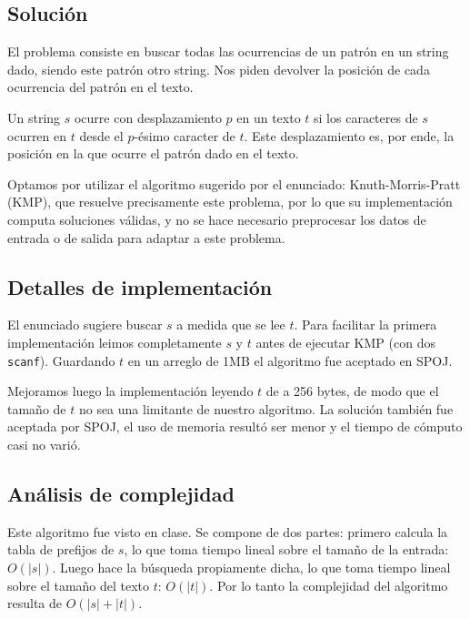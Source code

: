 \subsection*{Solución}

El problema consiste en buscar todas las ocurrencias de un patrón en un string
dado, siendo este patrón otro string. Nos piden devolver la posición de cada
ocurrencia del patrón en el texto.

Un string $s$ ocurre con desplazamiento $p$ en un texto $t$ si los caracteres
de $s$ ocurren en $t$ desde el $p$-ésimo caracter de $t$. Este desplazamiento
es, por ende, la posición en la que ocurre el patrón dado en el texto.

Optamos por utilizar el algoritmo sugerido por el
enunciado: Knuth-Morris-Pratt (KMP), que resuelve precisamente
este problema, por lo que su implementación computa soluciones válidas,
y no se hace necesario preprocesar los datos de entrada o de salida para
adaptar a este problema.

\subsection*{Detalles de implementación}

El enunciado sugiere buscar $s$ a medida que se lee $t$. Para facilitar la
primera implementación leimos completamente $s$ y $t$ antes de ejecutar KMP
(con dos {\tt scanf}). Guardando $t$ en un arreglo de 1MB el algoritmo fue
aceptado en SPOJ.

Mejoramos luego la implementación leyendo $t$ de a 256 bytes, de modo que
el tamaño de $t$ no sea una limitante de nuestro algoritmo. La solución
también fue aceptada por SPOJ, el uso de memoria resultó ser menor y el
tiempo de cómputo casi no varió.

\subsection*{Análisis de complejidad}

Este algoritmo fue visto en clase. Se compone de dos partes: primero calcula
la tabla de prefijos de $s$, lo que toma tiempo lineal sobre el tamaño de la
entrada: $O(|s|)$. Luego hace la búsqueda propiamente dicha, lo que toma
tiempo lineal sobre el tamaño del texto $t$: $O(|t|)$. Por lo tanto la
complejidad del algoritmo resulta de $O(|s| + |t|)$.
